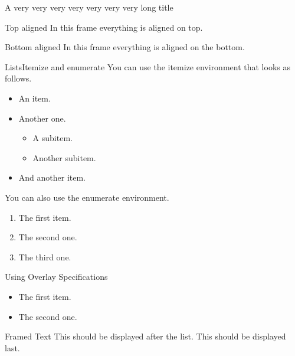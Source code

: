 %
%
%
%
%
\begin{frame}{A very very very very very very very long title}

\end{frame}
%
%
%
%
%
\begin{frame}[t]{Top aligned}
In this frame everything is aligned on top.
\end{frame}
%
%
%
%
%
\begin{frame}[b]{Bottom aligned}
In this frame everything is aligned on the bottom.
\end{frame}
%
%
%
%
%
\begin{frame}{Lists}{Itemize and enumerate}
You can use the itemize environment that looks as follows.
\begin{itemize}
\item An item.
\item Another one.
\begin{itemize}
\item A subitem.
\item Another subitem.
\end{itemize}
\item And another item.
\end{itemize}
%
\vfill%
You can also use the enumerate environment.
\begin{enumerate}
\item The first item.
\item The second one.
\item The third one.
\end{enumerate}
\end{frame}

\begin{frame}{Using Overlay Specifications}
\begin{itemize}[<+(1)->]
\item The first item.
\item The second one.
\end{itemize}
\pause
\begin{block}{Framed Text}
This should be displayed after the list.
\pause
This should be displayed last.
\end{block}
\end{frame}
%
%
%
%
%
